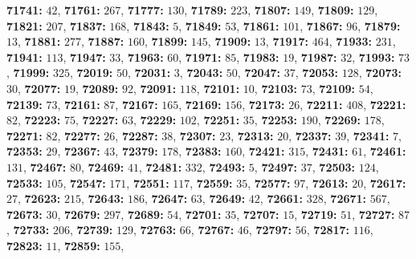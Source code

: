 \textsf{\bfseries 71741:} $42$, \textsf{\bfseries 71761:} $267$, \textsf{\bfseries 71777:} $130$, \textsf{\bfseries 71789:} $223$, \textsf{\bfseries 71807:} $149$, \textsf{\bfseries 71809:} $129$, \textsf{\bfseries 71821:} $207$, \textsf{\bfseries 71837:} $168$, \textsf{\bfseries 71843:} $5$, \textsf{\bfseries 71849:} $53$, \textsf{\bfseries 71861:} $101$, \textsf{\bfseries 71867:} $96$, \textsf{\bfseries 71879:} $13$, \textsf{\bfseries 71881:} $277$, \textsf{\bfseries 71887:} $160$, \textsf{\bfseries 71899:} $145$, \textsf{\bfseries 71909:} $13$, \textsf{\bfseries 71917:} $464$, \textsf{\bfseries 71933:} $231$, \textsf{\bfseries 71941:} $113$, \textsf{\bfseries 71947:} $33$, \textsf{\bfseries 71963:} $60$, \textsf{\bfseries 71971:} $85$, \textsf{\bfseries 71983:} $19$, \textsf{\bfseries 71987:} $32$, \textsf{\bfseries 71993:} $73$, \textsf{\bfseries 71999:} $325$, \textsf{\bfseries 72019:} $50$, \textsf{\bfseries 72031:} $3$, \textsf{\bfseries 72043:} $50$, \textsf{\bfseries 72047:} $37$, \textsf{\bfseries 72053:} $128$, \textsf{\bfseries 72073:} $30$, \textsf{\bfseries 72077:} $19$, \textsf{\bfseries 72089:} $92$, \textsf{\bfseries 72091:} $118$, \textsf{\bfseries 72101:} $10$, \textsf{\bfseries 72103:} $73$, \textsf{\bfseries 72109:} $54$, \textsf{\bfseries 72139:} $73$, \textsf{\bfseries 72161:} $87$, \textsf{\bfseries 72167:} $165$, \textsf{\bfseries 72169:} $156$, \textsf{\bfseries 72173:} $26$, \textsf{\bfseries 72211:} $408$, \textsf{\bfseries 72221:} $82$, \textsf{\bfseries 72223:} $75$, \textsf{\bfseries 72227:} $63$, \textsf{\bfseries 72229:} $102$, \textsf{\bfseries 72251:} $35$, \textsf{\bfseries 72253:} $190$, \textsf{\bfseries 72269:} $178$, \textsf{\bfseries 72271:} $82$, \textsf{\bfseries 72277:} $26$, \textsf{\bfseries 72287:} $38$, \textsf{\bfseries 72307:} $23$, \textsf{\bfseries 72313:} $20$, \textsf{\bfseries 72337:} $39$, \textsf{\bfseries 72341:} $7$, \textsf{\bfseries 72353:} $29$, \textsf{\bfseries 72367:} $43$, \textsf{\bfseries 72379:} $178$, \textsf{\bfseries 72383:} $160$, \textsf{\bfseries 72421:} $315$, \textsf{\bfseries 72431:} $61$, \textsf{\bfseries 72461:} $131$, \textsf{\bfseries 72467:} $80$, \textsf{\bfseries 72469:} $41$, \textsf{\bfseries 72481:} $332$, \textsf{\bfseries 72493:} $5$, \textsf{\bfseries 72497:} $37$, \textsf{\bfseries 72503:} $124$, \textsf{\bfseries 72533:} $105$, \textsf{\bfseries 72547:} $171$, \textsf{\bfseries 72551:} $117$, \textsf{\bfseries 72559:} $35$, \textsf{\bfseries 72577:} $97$, \textsf{\bfseries 72613:} $20$, \textsf{\bfseries 72617:} $27$, \textsf{\bfseries 72623:} $215$, \textsf{\bfseries 72643:} $186$, \textsf{\bfseries 72647:} $63$, \textsf{\bfseries 72649:} $42$, \textsf{\bfseries 72661:} $328$, \textsf{\bfseries 72671:} $567$, \textsf{\bfseries 72673:} $30$, \textsf{\bfseries 72679:} $297$, \textsf{\bfseries 72689:} $54$, \textsf{\bfseries 72701:} $35$, \textsf{\bfseries 72707:} $15$, \textsf{\bfseries 72719:} $51$, \textsf{\bfseries 72727:} $87$, \textsf{\bfseries 72733:} $206$, \textsf{\bfseries 72739:} $129$, \textsf{\bfseries 72763:} $66$, \textsf{\bfseries 72767:} $46$, \textsf{\bfseries 72797:} $56$, \textsf{\bfseries 72817:} $116$, \textsf{\bfseries 72823:} $11$, \textsf{\bfseries 72859:} $155$, 
